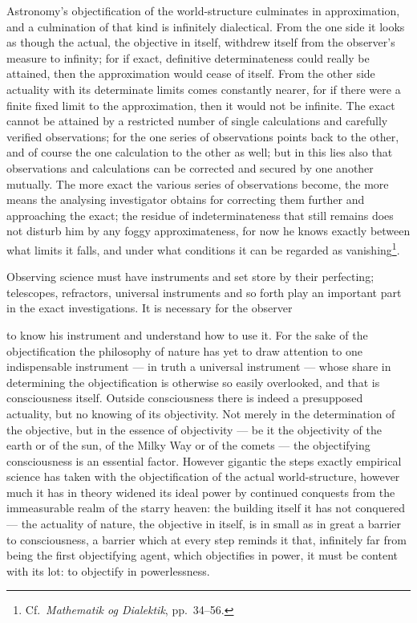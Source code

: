 \documentclass[12pt,a4paper]{book}
\begin{document}
Astronomy's objectification of the world-structure culminates in approximation, and a culmination of
that kind is infinitely dialectical. From the one side it looks as though the actual, the objective in itself, withdrew
itself from the observer's measure to infinity; for if exact, definitive determinateness could really be
attained, then the approximation would cease of itself. From the other side actuality with its determinate
limits comes constantly nearer, for if there were a finite fixed limit to the approximation, then it would not
be infinite. The exact cannot be attained by a restricted number of single calculations and carefully verified
observations; for the one series of observations points back to the other, and of course the one calculation to
the other as well; but in this lies also that observations and calculations can be corrected and secured by one
another mutually. The more exact the various series of observations become, the more means the analysing
investigator obtains for correcting them further and approaching the exact; the residue of indeterminateness
that still remains does not disturb him by any foggy approximateness, for now he knows exactly between what
limits it falls, and under what conditions
it can be regarded as vanishing\footnote{%
Cf.\ \textit{Mathematik og Dialektik}, pp.\ 34--56.}.

Observing science must have instruments and set store by their perfecting; telescopes, refractors, universal
instruments and so forth play an important part in the exact investigations. It is
necessary for the observer

to know his instrument and understand how to use it. For the sake of the objectification the
philosophy of nature has yet to draw attention to one indispensable instrument --- in truth a
universal instrument --- whose share in determining the objectification is otherwise so easily
overlooked, and that is consciousness itself. Outside consciousness there is indeed a presupposed
actuality, but no knowing of its objectivity. Not merely in the determination of the objective, but in
the essence of objectivity --- be it the objectivity of the earth or of the sun, of the Milky Way or of
the comets --- the objectifying consciousness is an essential factor. However gigantic the steps exactly
empirical science has taken with the objectification of the actual world-structure, however much it has
in theory widened its ideal power by continued conquests from the immeasurable realm of the starry
heaven: the building itself it has not conquered --- the actuality of nature, the objective in itself, is
in small as in great a barrier to consciousness, a barrier which at every step reminds it that, infinitely
far from being the first objectifying agent, which objectifies in power, it must be content with its lot:
to objectify in powerlessness.
\end{document}
